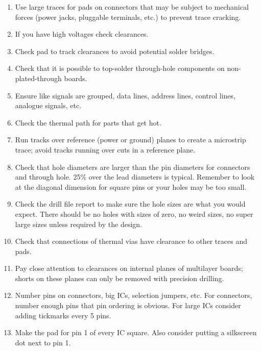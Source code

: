 \begin{enumerate}
\item Use large traces for pads on connectors that may be subject to
  mechanical forces (power jacks, pluggable terminals, etc.) to
  prevent trace cracking.

\item If you have high voltages check clearances.

\item Check pad to track clearances to avoid potential solder bridges.

\item Check that it is possible to top-solder through-hole components
  on non-plated-through boards.

\item Ensure like signals are grouped, data lines, address lines, control lines, analogue signals, etc.

\item Check the thermal path for parts that get hot.

\item Run tracks over reference (power or ground) planes to create a
  microstrip trace; avoid tracks running over cuts in a reference
  plane.

\item Check that hole diameters are larger than the pin diameters for
  connectors and through hole. 25\% over the lead diameters is
  typical.  Remember to look at the diagonal dimension for square pins
  or your holes may be too small.

\item Check the drill file report to make sure the hole sizes are what
  you would expect. There should be no holes with sizes of zero, no
  weird sizes, no super large sizes unless required by the design.

\item Check that connections of thermal vias have clearance to other
  traces and pads.

\item Pay close attention to clearances on internal planes of
  multilayer boards; shorts on these planes can only be removed with
  precision drilling.

\item Number pins on connectors, big ICs, selection jumpers, etc. For
  connectors, number enough pins that pin ordering is obvious. For
  large ICs consider adding tickmarks every 5 pins.

\item Make the pad for pin 1 of every IC square. Also consider putting
  a silkscreen dot next to pin 1.


\end{enumerate}
